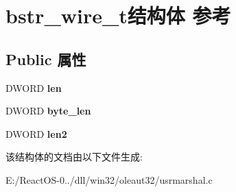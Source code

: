 \hypertarget{structbstr__wire__t}{}\section{bstr\+\_\+wire\+\_\+t结构体 参考}
\label{structbstr__wire__t}
\subsection*{Public 属性}
\begin{DoxyCompactItemize}
\item 
\mbox{\label{structbstr__wire__t_ad1d49c34ca9b57a9d3263851058eb1cc}} 
D\+W\+O\+RD {\bfseries len}
\item 
\mbox{\label{structbstr__wire__t_acab1a5699fa73aacde2cfdbf015b4125}} 
D\+W\+O\+RD {\bfseries byte\+\_\+len}
\item 
\mbox{\label{structbstr__wire__t_ad0835d30cbbedb7a1126b0cad02f0b57}} 
D\+W\+O\+RD {\bfseries len2}
\end{DoxyCompactItemize}


该结构体的文档由以下文件生成\+:\begin{DoxyCompactItemize}
\item 
E\+:/\+React\+O\+S-\/0../dll/win32/oleaut32/usrmarshal.\+c\end{DoxyCompactItemize}

